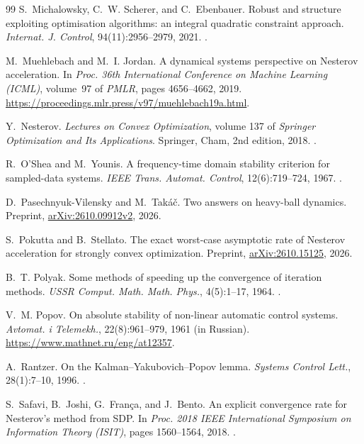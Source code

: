 \documentclass[11pt]{article}
\theoremstyle{definition}
\theoremstyle{remark}
\begin{document}
\begin{thebibliography}{99}
 S.~Michalowsky, C.~W. Scherer, and C.~Ebenbauer. Robust and structure exploiting optimisation algorithms: an integral quadratic constraint approach. \textit{Internat. J. Control}, 94(11):2956--2979, 2021. .

 M.~Muehlebach and M.~I. Jordan. A dynamical systems perspective on Nesterov acceleration. In \textit{Proc. 36th International Conference on Machine Learning (ICML)}, volume~97 of \textit{PMLR}, pages 4656--4662, 2019. \url{https://proceedings.mlr.press/v97/muehlebach19a.html}.

 Y.~Nesterov. \textit{Lectures on Convex Optimization}, volume 137 of \textit{Springer Optimization and Its Applications}. Springer, Cham, 2nd edition, 2018. .

 R.~O'Shea and M.~Younis. A frequency-time domain stability criterion for sampled-data systems. \textit{IEEE Trans. Automat. Control}, 12(6):719--724, 1967. .

 D.~Pasechnyuk-Vilensky and M.~Tak\'{a}\v{c}. Two answers on heavy-ball dynamics. Preprint, \href{https://arxiv.org/abs/2610.09912v2}{arXiv:2610.09912v2}, 2026.

 S.~Pokutta and B.~Stellato. The exact worst-case asymptotic rate of Nesterov acceleration for strongly convex optimization. Preprint, \href{https://arxiv.org/abs/2610.15125}{arXiv:2610.15125}, 2026.

 B.~T. Polyak. Some methods of speeding up the convergence of iteration methods. \textit{USSR Comput. Math. Math. Phys.}, 4(5):1--17, 1964. .

 V.~M. Popov. On absolute stability of non-linear automatic control systems. \textit{Avtomat. i Telemekh.}, 22(8):961--979, 1961 (in Russian). \url{https://www.mathnet.ru/eng/at12357}.

 A.~Rantzer. On the Kalman--Yakubovich--Popov lemma. \textit{Systems Control Lett.}, 28(1):7--10, 1996. .

 S.~Safavi, B.~Joshi, G.~Fran\c{c}a, and J.~Bento. An explicit convergence rate for Nesterov's method from SDP. In \textit{Proc. 2018 IEEE International Symposium on Information Theory (ISIT)}, pages 1560--1564, 2018. .


\end{thebibliography}
\end{document}
